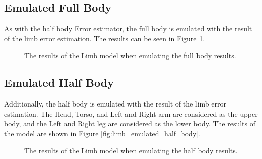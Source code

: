 \subsection{Emulated Full Body}

As with the half body Error estimator, the full body is emulated with the result of the limb error estimation. The results can be seen in Figure \ref{fig:limbs_emulated_full_body}. 

\begin{figure}
    \centering
    \caption[Limb model with emulated Full Body results]{The results of the Limb model when emulating the full body results.}
    \label{fig:limbs_emulated_full_body}
\end{figure}
  
\subsection{Emulated Half Body}

Additionally, the half body is emulated with the result of the limb error estimation. The Head, Torso, and Left and Right arm are considered as the upper body, and the Left and Right leg are considered as the lower body. The results of the model are shown in Figure \ref{fig:limb_emulated_half_body}.

\begin{figure}
    \centering
    \caption[Limb model with emulated Half Body results]{The results of the Limb model when emulating the half body results.}
    \label{fig:limbs_emulated_half_body}
\end{figure}
